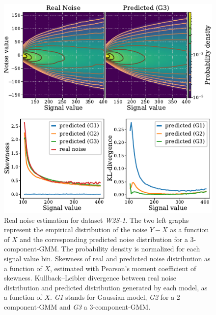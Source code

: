 \documentclass[lettersize,journal]{IEEEtran}
\begin{document}
\begin{figure}[!htbp]
\vskip -0.1in
\begin{center}
\centerline{\includegraphics[width=\columnwidth]{fig_skewness_w2s-1.pdf}}
\caption{Real noise estimation for dataset \textit{W2S-1}.
The two left graphs represent the empirical distribution of the noise $Y - X$ as a function of $X$ and the corresponding predicted noise distribution for a 3-component-GMM.
The probability density is normalized for each signal value bin.
Skewness of real and predicted noise distribution as a function of $X$, estimated with Pearson's moment coefficient of skewness.
Kullback–Leibler divergence between real noise distribution and predicted distribution generated by each model, as a function of $X$.
\textit{G1} stands for Gaussian model, \textit{G2} for a 2-component-GMM and \textit{G3} a 3-component-GMM.
}
\label{fig:skewness}
\end{center}
\end{figure}
\end{document}
